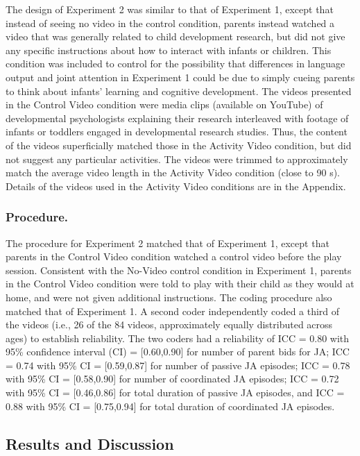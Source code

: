 \documentclass[man,floatsintext]{apa6}
\begin{document}
The design of Experiment 2 was similar to that of Experiment 1, except that instead of seeing no video in the control condition, parents instead watched a video that was generally related to child development research, but did not give any specific instructions about how to interact with infants or children.
This condition was included to control for the possibility that differences in language output and joint attention in Experiment 1 could be due to simply cueing parents to think about infants' learning and cognitive development.
The videos presented in the Control Video condition were media clips (available on YouTube) of developmental psychologists explaining their research interleaved with footage of infants or toddlers engaged in developmental research studies.
Thus, the content of the videos superficially matched those in the Activity Video condition, but did not suggest any particular activities.
The videos were trimmed to approximately match the average video length in the Activity Video condition (close to 90 s).
Details of the videos used in the Activity Video conditions are in the Appendix.

\hypertarget{procedure.-1}{%
\subsubsection{Procedure.}\label{procedure.-1}}

The procedure for Experiment 2 matched that of Experiment 1, except that parents in the Control Video condition watched a control video before the play session.
Consistent with the No-Video control condition in Experiment 1, parents in the Control Video condition were told to play with their child as they would at home, and were not given additional instructions.
The coding procedure also matched that of Experiment 1.
A second coder independently coded a third of the videos (i.e., 26 of the 84 videos, approximately equally distributed across ages) to establish reliability.
The two coders had a reliability of ICC = 0.80 with 95\% confidence interval (CI) = {[}0.60,0.90{]} for number of parent bids for JA; ICC = 0.74 with 95\% CI = {[}0.59,0.87{]} for number of passive JA episodes; ICC = 0.78 with 95\% CI = {[}0.58,0.90{]} for number of coordinated JA episodes; ICC = 0.72 with 95\% CI = {[}0.46,0.86{]} for total duration of passive JA episodes, and ICC = 0.88 with 95\% CI = {[}0.75,0.94{]} for total duration of coordinated JA episodes.

\hypertarget{results-and-discussion-1}{%
\subsection{Results and Discussion}\label{results-and-discussion-1}}
\end{document}
